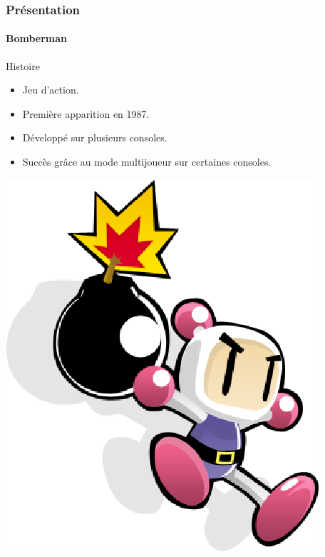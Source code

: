 \begin{frame}
\frametitle{Présentation}
\framesubtitle{Bomberman}
\begin{minipage}{7cm}
Histoire
	\begin{itemize}
		\item Jeu d'action.
		\item Première apparition en 1987.
		\item Développé sur plusieurs consoles.
		\item Succès grâce au mode multijoueur sur certaines consoles.
	\end{itemize}
\end{minipage}  \includegraphics[scale=0.3]{img/bomberman1.png} 

\end{frame}


 


